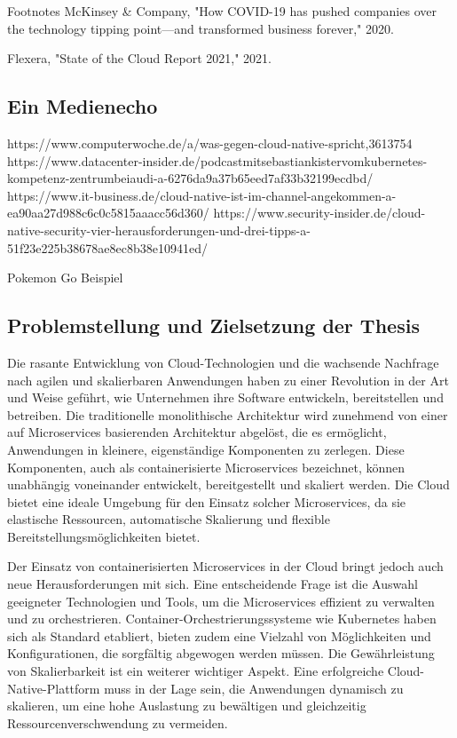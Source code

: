 Footnotes
McKinsey \& Company, "How COVID-19 has pushed companies over the technology tipping point—and transformed business forever," 2020.

Flexera, "State of the Cloud Report 2021," 2021.




\subsection{Ein Medienecho}
https://www.computerwoche.de/a/was-gegen-cloud-native-spricht,3613754
https://www.datacenter-insider.de/podcastmitsebastiankistervomkubernetes-kompetenz-zentrumbeiaudi-a-6276da9a37b65eed7af33b32199ecdbd/
https://www.it-business.de/cloud-native-ist-im-channel-angekommen-a-ea90aa27d988c6c0c5815aaacc56d360/
https://www.security-insider.de/cloud-native-security-vier-herausforderungen-und-drei-tipps-a-51f23e225b38678ae8ec8b38e10941ed/

Pokemon Go Beispiel
\subsection{Problemstellung und Zielsetzung der Thesis}
Die rasante Entwicklung von Cloud-Technologien und die wachsende Nachfrage nach agilen und skalierbaren Anwendungen haben zu einer Revolution in der Art und Weise geführt, wie Unternehmen ihre Software entwickeln, bereitstellen und betreiben. Die traditionelle monolithische Architektur wird zunehmend von einer auf Microservices basierenden Architektur abgelöst, die es ermöglicht, Anwendungen in kleinere, eigenständige Komponenten zu zerlegen. Diese Komponenten, auch als containerisierte Microservices bezeichnet, können unabhängig voneinander entwickelt, bereitgestellt und skaliert werden. Die Cloud bietet eine ideale Umgebung für den Einsatz solcher Microservices, da sie elastische Ressourcen, automatische Skalierung und flexible Bereitstellungsmöglichkeiten bietet.

Der Einsatz von containerisierten Microservices in der Cloud bringt jedoch auch neue Herausforderungen mit sich. Eine entscheidende Frage ist die Auswahl geeigneter Technologien und Tools, um die Microservices effizient zu verwalten und zu orchestrieren. Container-Orchestrierungssysteme wie Kubernetes haben sich als Standard etabliert, bieten zudem eine Vielzahl von Möglichkeiten und Konfigurationen, die sorgfältig abgewogen werden müssen. Die Gewährleistung von Skalierbarkeit ist ein weiterer wichtiger Aspekt. Eine erfolgreiche Cloud-Native-Plattform muss in der Lage sein, die Anwendungen dynamisch zu skalieren, um eine hohe Auslastung zu bewältigen und gleichzeitig Ressourcenverschwendung zu vermeiden.

